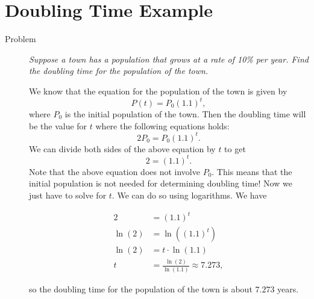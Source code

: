 \documentclass[11pt]{article}
\begin{document}
\drawtitle

\section*{Doubling Time Example}

\begin{description}
\item[Problem]\textit{Suppose a town has a population that grows at a
    rate of 10\% per year.  Find the doubling time for the population
    of the town.}

\vspace{.3in}

We know that the equation for the population of the town is given by
\[
P(t)=P_0 (1.1)^t,
\]
where $P_0$ is the initial population of the town.  Then the doubling
time will be the value for $t$ where the following equations holds:
\[
2P_0=P_0(1.1)^t.
\]
We can divide both sides of the above equation by $t$ to get
\[
2=(1.1)^t.
\]
Note that the above equation does not involve $P_0$.  This means that
the initial population is not needed for determining doubling time!
Now we just have to solve for $t$.  We can do so using logarithms.  We
have

\begin{align*}
  2 &= (1.1)^t\\
  \ln(2) &= \ln\left((1.1)^t\right)\\
  \ln(2) &= t\cdot\ln\left(1.1\right)\\
  t &= \frac{\ln(2)}{\ln(1.1)}\approx 7.273,
\end{align*}

so the doubling time for the population of the town is about $7.273$
years.


\end{description}
\end{document}
